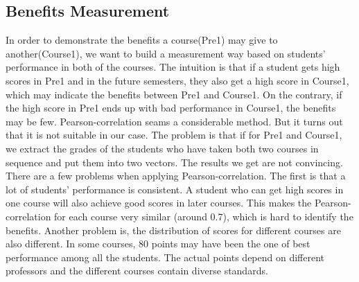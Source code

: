\subsection{Benefits Measurement}
\label{sec:benefits}
In order to demonstrate the benefits a course(Pre1) may give to another(Course1), we want to build a measurement way based on students’ performance in both of the courses. The intuition is that if a student gets high scores in Pre1 and in the future semesters, they also get a high score in Course1, which may indicate the benefits between Pre1 and Course1. On the contrary, if the high score in Pre1 ends up with bad performance in Course1, the benefits may be few. Pearson-correlation seams a considerable method. But it turns out that it is not suitable in our case. The problem is that if for Pre1 and Course1, we extract the grades of the students who have taken both two courses in sequence and put them into two vectors. The results we get are not convincing. There are a few problems when applying Pearson-correlation. The first is that a lot of students’ performance is consistent. A student who can get high scores in one course will also achieve good scores in later courses. This makes the Pearson-correlation for each course very similar (around 0.7), which is hard to identify the benefits. Another problem is, the distribution of scores for different courses are also different. In some courses, 80 points may have been the one of best performance among all the students. The actual points depend on different professors and the different courses contain diverse standards.

